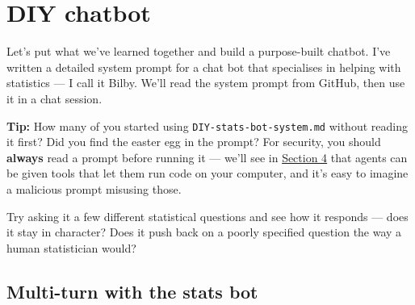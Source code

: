 \documentclass[
  letterpaper,
  DIV=11,
  numbers=noendperiod]{scrreprt}
\newenvironment{Shaded}{\begin{snugshade}}{\end{snugshade}}
\newcommand{\AttributeTok}[1]{\textcolor[rgb]{0.40,0.45,0.13}{#1}}
\newcommand{\DecValTok}[1]{\textcolor[rgb]{0.68,0.00,0.00}{#1}}
\newcommand{\FunctionTok}[1]{\textcolor[rgb]{0.28,0.35,0.67}{#1}}
\newcommand{\NormalTok}[1]{\textcolor[rgb]{0.00,0.23,0.31}{#1}}
\newcommand{\OtherTok}[1]{\textcolor[rgb]{0.00,0.23,0.31}{#1}}
\newcommand{\SpecialCharTok}[1]{\textcolor[rgb]{0.37,0.37,0.37}{#1}}
\newcommand{\StringTok}[1]{\textcolor[rgb]{0.13,0.47,0.30}{#1}}
\begin{document}
\chapter{DIY chatbot}\label{diy-chatbot}

Let's put what we've learned together and build a purpose-built chatbot.
I've written a detailed system prompt for a chat bot that specialises in
helping with statistics --- I call it Bilby. We'll read the system
prompt from GitHub, then use it in a chat session.

\begin{Shaded}
\end{Shaded}

\textbf{Tip:} How many of you started using
\texttt{DIY-stats-bot-system.md} without reading it first? Did you find
the easter egg in the prompt? For security, you should \textbf{always}
read a prompt before running it --- we'll see in
\hyperref[section-4-security-data-privacy-and-cloud-agents]{Section 4}
that agents can be given tools that let them run code on your computer,
and it's easy to imagine a malicious prompt misusing those.

Try asking it a few different statistical questions and see how it
responds --- does it stay in character? Does it push back on a poorly
specified question the way a human statistician would?

\section{Multi-turn with the stats
bot}\label{multi-turn-with-the-stats-bot}
\end{document}
